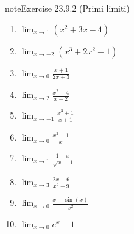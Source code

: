 \documentclass[letterpaper,10pt,italian]{jupyterBook}
\begin{document}
\begin{sphinxadmonition}{note}{Exercise 23.9.2 (Primi limiti)}


\begin{enumerate}
%
\item {} 
\sphinxAtStartPar
\(\lim_{x \to 1} (x^2 + 3x - 4)\)

\item {} 
\sphinxAtStartPar
\(\lim_{x \to -2} (x^3 + 2x^2 - 1)\)

\item {} 
\sphinxAtStartPar
\(\lim_{x \to 0} \frac{x + 1}{2x + 3}\)

\item {} 
\sphinxAtStartPar
\(\lim_{x \to 2} \frac{x^2 - 4}{x - 2}\)

\item {} 
\sphinxAtStartPar
\(\lim_{x \to -1} \frac{x^3 + 1}{x + 1}\)

\item {} 
\sphinxAtStartPar
\(\lim_{x \to 0} \frac{x^2 - 1}{x}\)

\item {} 
\sphinxAtStartPar
\(\lim_{x \to 1} \frac{1 - x}{\sqrt{x} - 1}\)

\item {} 
\sphinxAtStartPar
\(\lim_{x \to 3} \frac{2x - 6}{x^2 - 9}\)

\item {} 
\sphinxAtStartPar
\(\lim_{x \to 0} \frac{x + \sin(x)}{x^2}\)

\item {} 
\sphinxAtStartPar
\(\lim_{x \to 0} e^x - 1\)

\end{enumerate}
\end{sphinxadmonition}
 \label{exercise:ch/infinitesimal_calculus/analysis-problems-exercise-2}
\end{document}
